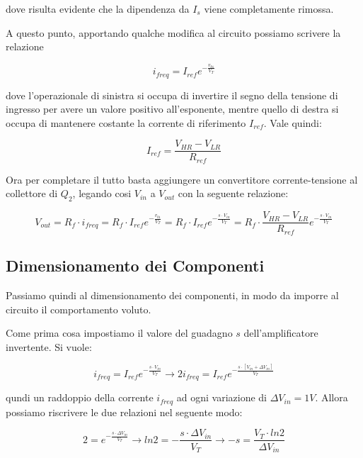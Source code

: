 dove risulta evidente che la dipendenza da $I_s$ viene completamente rimossa.

A questo punto, apportando qualche modifica al circuito possiamo scrivere la relazione

$$i_{freq}=I_{ref}e^{-\frac{v_{b1}}{V_T}}$$


dove l'operazionale di sinistra si occupa di invertire il segno della tensione di ingresso
per avere un valore positivo all'esponente, mentre quello di destra si occupa di mantenere
costante la corrente di riferimento $I_{ref}$. Vale quindi:

$$I_{ref}=\frac{V_{HR}-V_{LR}}{R_{ref}}$$

Ora per completare il tutto basta aggiungere un convertitore corrente-tensione al collettore
di $Q_2$, legando cosi $V_{in}$ a $V_{out}$ con la seguente relazione:

$$
    V_{out}=R_f\cdot i_{freq}=
    R_f\cdot I_{ref}e^{-\frac{v_{b1}}{V_T}}=
    R_f\cdot I_{ref}e^{-\frac{s\cdot V_{in}}{V_T}}=
    R_f\cdot \frac{V_{HR}-V_{LR}}{R_{ref}}e^{-\frac{s\cdot V_{in}}{V_T}}
$$



\subsection*{Dimensionamento dei Componenti}


Passiamo quindi al dimensionamento dei componenti, in modo da imporre al circuito il
comportamento voluto.

Come prima cosa impostiamo il valore del guadagno $s$ dell'amplificatore invertente.
Si vuole:

$$
    i_{freq}=I_{ref}e^{-\frac{s\cdot V_{in}}{V_T}}
    \rightarrow
    2i_{freq}=I_{ref}e^{-\frac{s\cdot[V_{in}+\Delta V_{in}]}{V_T}}
$$

qundi un raddoppio della corrente $i_{freq}$ ad ogni variazione di $\Delta V_{in}=1V$.
Allora possiamo riscrivere le due relazioni nel seguente modo:

$$
    2=e^{-\frac{s\cdot\Delta V_{in}}{V_T}}
    \rightarrow
    ln{2}=-\frac{s\cdot\Delta V_{in}}{V_T}
    \rightarrow
    -s=\frac{V_T\cdot ln{2}}{\Delta V_{in}}
$$

